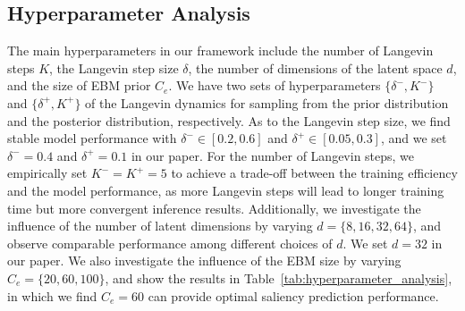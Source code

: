 \documentclass{article}
\begin{document}
\subsection{Hyperparameter Analysis}


The main hyperparameters in our framework include
the number of Langevin steps $K$, the Langevin step size $\delta$, the number of dimensions of the latent space $d$, and the size of EBM prior $C_e$. We have two sets of hyperparameters $\{\delta^-, K^-\}$ and $\{\delta^+, K^+\}$ of the Langevin dynamics for sampling from the prior distribution and the posterior distribution, respectively.  
As to the Langevin step size, we find stable model performance with $\delta^{-}\in [0.2,0.6]$ and $\delta^{+}\in [0.05,0.3]$, and we set $\delta^{-}=0.4$ and $\delta^{+}=0.1$ in our paper. For the number of Langevin steps, we empirically set $K^-=K^+=5$ to achieve a trade-off between the training efficiency and the model performance, as more Langevin steps will lead to longer training time but more convergent inference results. Additionally, we investigate the influence of the number of latent dimensions by varying  $d=\{8,16,32,64\}$, and observe comparable performance among different choices of $d$. We set $d=32$ in our paper. We also investigate the influence of the EBM size by varying $C_e=\{20,60,100\}$, and show the results in Table~\ref{tab:hyperparameter_analysis}, in which we find $C_e=60$ can provide optimal saliency prediction performance.
\end{document}
